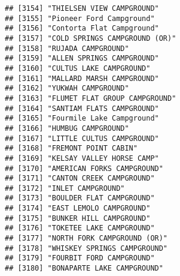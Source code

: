 \documentclass[
]{article}
\begin{document}
\begin{verbatim}
## [3154] "THIELSEN VIEW CAMPGROUND"                                                            
## [3155] "Pioneer Ford Campground"                                                             
## [3156] "Contorta Flat Campground"                                                            
## [3157] "COLD SPRINGS CAMPGROUND (OR)"                                                        
## [3158] "RUJADA CAMPGROUND"                                                                   
## [3159] "ALLEN SPRINGS CAMPGROUND"                                                            
## [3160] "CULTUS LAKE CAMPGROUND"                                                              
## [3161] "MALLARD MARSH CAMPGROUND"                                                            
## [3162] "YUKWAH CAMPGROUND"                                                                   
## [3163] "FLUMET FLAT GROUP CAMPGROUND"                                                        
## [3164] "SANTIAM FLATS CAMPGROUND"                                                            
## [3165] "Fourmile Lake Campground"                                                            
## [3166] "HUMBUG CAMPGROUND"                                                                   
## [3167] "LITTLE CULTUS CAMPGROUND"                                                            
## [3168] "FREMONT POINT CABIN"                                                                 
## [3169] "KELSAY VALLEY HORSE CAMP"                                                            
## [3170] "AMERICAN FORKS CAMPGROUND"                                                           
## [3171] "CANTON CREEK CAMPGROUND"                                                             
## [3172] "INLET CAMPGROUND"                                                                    
## [3173] "BOULDER FLAT CAMPGROUND"                                                             
## [3174] "EAST LEMOLO CAMPGROUND"                                                              
## [3175] "BUNKER HILL CAMPGROUND"                                                              
## [3176] "TOKETEE LAKE CAMPGROUND"                                                             
## [3177] "NORTH FORK CAMPGROUND (OR)"                                                          
## [3178] "WHISKEY SPRINGS CAMPGROUND"                                                          
## [3179] "FOURBIT FORD CAMPGROUND"                                                             
## [3180] "BONAPARTE LAKE CAMPGROUND"                                                           

\end{verbatim}
\end{document}
